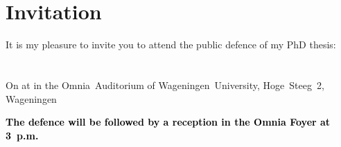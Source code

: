 \documentclass{article}
\begin{document}
\centering
\section*{Invitation}

It is my pleasure to invite you to attend the public defence of my PhD thesis:

\section*{\thetitle{}}

\vspace{0.2cm}

On  at  in the Omnia~Auditorium of Wageningen~University, Hoge~Steeg~2, Wageningen

\vspace{1.5cm}

\textcolor{black}{\textbf{The defence will be followed by a reception in the Omnia Foyer at 3~p.m.}}

\vspace*{\fill} 

\subsection*{}

 \\

\subsection*{}

 \\

 \\
\end{document}
